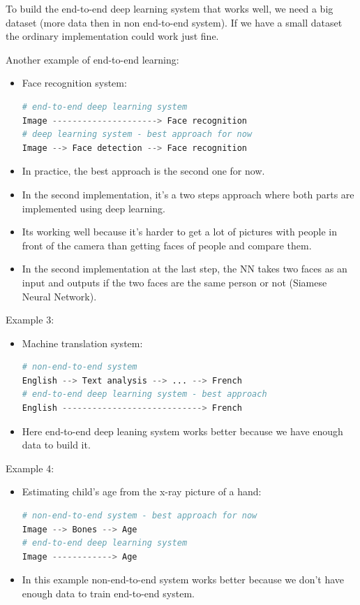 To build the end-to-end deep learning system that works well, we need a big dataset (more data then in non end-to-end system). If we have a small dataset the ordinary implementation could work just fine.

Another example of end-to-end learning:

\begin{itemize}
    \item Face recognition system:
\begin{lstlisting}[language=python]
# end-to-end deep learning system
Image ---------------------> Face recognition
# deep learning system - best approach for now
Image --> Face detection --> Face recognition    
\end{lstlisting}
    \item In practice, the best approach is the second one for now.
    \item In the second implementation, it's a two steps approach where both parts are implemented using deep learning.
    \item Its working well because it's harder to get a lot of pictures with people in front of the camera than getting faces of people and compare them.
    \item In the second implementation at the last step, the NN takes two faces as an input and outputs if the two faces are the same person or not (Siamese Neural Network\cite{koch2015siamese}).
\end{itemize}

Example 3:

\begin{itemize}
    \item Machine translation system:
\begin{lstlisting}[language=python]
# non-end-to-end system
English --> Text analysis --> ... --> French    
# end-to-end deep learning system - best approach
English ----------------------------> French    
\end{lstlisting}
    \item Here end-to-end deep leaning system works better because we have enough data to build it.
\end{itemize}

Example 4:

\begin{itemize}
    \item Estimating child's age from the x-ray picture of a hand:
\begin{lstlisting}[language=python]
# non-end-to-end system - best approach for now
Image --> Bones --> Age   
# end-to-end deep learning system
Image ------------> Age    
\end{lstlisting}
    \item In this example non-end-to-end system works better because we don't have enough data to train end-to-end system.
\end{itemize}

